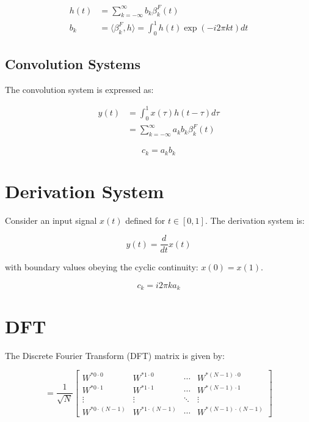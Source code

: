 \documentclass[12pt]{article}
\begin{document}
\begin{align}
h(t) &= \sum_{k=-\infty}^{\infty} b_k \beta_k^F(t) \\
b_k &= \langle \beta_k^F, h \rangle = \int_0^1 h(t) \exp(-i2\pi kt) dt
\end{align}

\subsection{Convolution Systems}

The convolution system is expressed as:

\begin{align}
y(t) &= \int_0^1 x(\tau) h(t - \tau) d\tau \\
&= \sum_{k=-\infty}^{\infty} a_k b_k \beta_k^F(t)
\end{align}

\begin{equation}
c_k = a_k b_k
\end{equation}

\section{Derivation System}

Consider an input signal $x(t)$ defined for $t \in [0,1]$. The derivation system is:

\begin{equation}
y(t) = \frac{d}{dt} x(t)
\end{equation}

with boundary values obeying the cyclic continuity: $x(0) = x(1)$.

\begin{equation}
c_k = i2\pi k a_k
\end{equation}

\section{DFT}

The Discrete Fourier Transform (DFT) matrix is given by:

\begin{equation}
[\text{DFT}] = \frac{1}{\sqrt{N}}
\begin{bmatrix}
W^{*0 \cdot 0} & W^{*1 \cdot 0} & \cdots & W^{*(N-1) \cdot 0} \\
W^{*0 \cdot 1} & W^{*1 \cdot 1} & \cdots & W^{*(N-1) \cdot 1} \\
\vdots & \vdots & \ddots & \vdots \\
W^{*0 \cdot (N-1)} & W^{*1 \cdot (N-1)} & \cdots & W^{*(N-1) \cdot (N-1)}
\end{bmatrix}
\end{equation}
\end{document}
